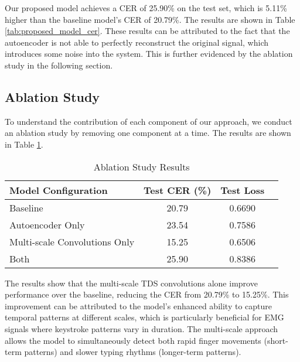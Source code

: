 Our proposed model achieves a CER of 25.90\% on the test set, which is 5.11\% higher than the baseline model's CER of 20.79\%. The results are shown in Table \ref{tab:proposed_model_cer}. These results can be attributed to the fact that the autoencoder is not able to perfectly reconstruct the original signal, which introduces some noise into the system. This is further evidenced by the ablation study in the following section.

\subsection{Ablation Study}

To understand the contribution of each component of our approach, we conduct an ablation study by removing one component at a time. The results are shown in Table \ref{tab:ablation_study}.

\begin{table}[h]
    \centering
    \caption{Ablation Study Results}
    \begin{tabular}{lccc}
        \hline
        \textbf{Model Configuration}  & \textbf{Test CER (\%)} & \textbf{Test Loss} \\
        \hline
        Baseline                      & 20.79                  & 0.6690             \\
        Autoencoder Only              & 23.54                  & 0.7586             \\
        Multi-scale Convolutions Only & 15.25                  & 0.6506             \\
        Both                          & 25.90                  & 0.8386             \\
        \hline
    \end{tabular}
    \label{tab:ablation_study}
\end{table}

The results show that the multi-scale TDS convolutions alone improve performance over the baseline, reducing the CER from 20.79\% to 15.25\%. This improvement can be attributed to the model's enhanced ability to capture temporal patterns at different scales, which is particularly beneficial for EMG signals where keystroke patterns vary in duration. The multi-scale approach allows the model to simultaneously detect both rapid finger movements (short-term patterns) and slower typing rhythms (longer-term patterns).

